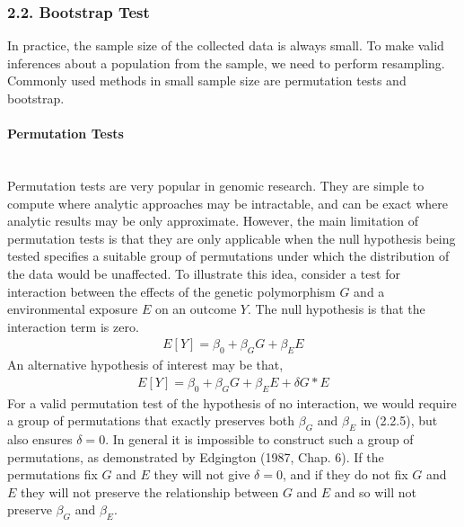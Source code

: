 \documentclass[11pt]{article}
\begin{document}
\subsubsection*{{2.2. Bootstrap Test}}
In practice, the sample size of the collected data is always small. To make valid inferences about a population from the sample, we need to perform resampling. Commonly used methods in small sample size are permutation tests and bootstrap.\\
\paragraph{Permutation Tests}\mbox{}\\
Permutation tests are very popular in genomic research. They are simple to compute where analytic approaches may be intractable, and can be exact where analytic results may be only approximate. However, the main limitation of permutation tests is that they are only applicable when the null hypothesis being tested specifies a suitable group of permutations under which the distribution of the data would be unaffected. To illustrate this idea, consider a test for interaction between the effects of the genetic polymorphism $G$ and a environmental exposure $E$ on an outcome $Y$. The null hypothesis is that the interaction term is zero.
\begin{align}
E[Y]=\beta_0+\beta_GG+\beta_EE
\end{align}
An alternative hypothesis of interest may be that,
\begin{align*}
E[Y]=\beta_0+\beta_GG+\beta_EE+\delta G*E
\end{align*}
For a valid permutation test of the hypothesis of no interaction, we would require a group of permutations that exactly preserves both $\beta_G$ and $\beta_E$ in (2.2.5), but also ensures $\delta=0$. In general it is impossible to construct such a group of permutations, as demonstrated by Edgington (1987, Chap. 6). If the permutations fix $G$ and $E$ they will not give $\delta=0$, and if they do not fix $G$ and $E$ they will not preserve the relationship between $G$ and $E$ and so will not preserve $\beta_G$ and $\beta_E$.
\end{document}
